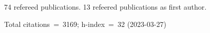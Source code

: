 74 refereed publications. 13 refeered publications as first author.

Total citations~=~3169; h-index~=~32 (2023-03-27)